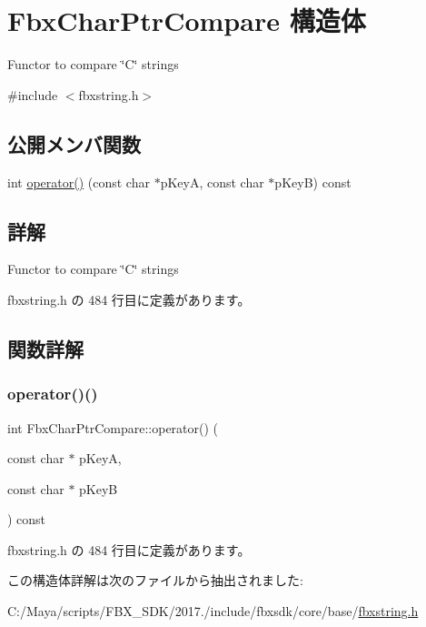 \hypertarget{struct_fbx_char_ptr_compare}{}\section{Fbx\+Char\+Ptr\+Compare 構造体}
\label{struct_fbx_char_ptr_compare}


Functor to compare \char`\"{}\+C\char`\"{} strings  




{\ttfamily \#include $<$fbxstring.\+h$>$}

\subsection*{公開メンバ関数}
\begin{DoxyCompactItemize}
\item 
int \hyperlink{struct_fbx_char_ptr_compare_a5806b2dabf3997394fe7db69526e876d}{operator()} (const char $\ast$p\+KeyA, const char $\ast$p\+KeyB) const
\end{DoxyCompactItemize}


\subsection{詳解}
Functor to compare \char`\"{}\+C\char`\"{} strings 

 fbxstring.\+h の 484 行目に定義があります。



\subsection{関数詳解}
\mbox{\label{struct_fbx_char_ptr_compare_a5806b2dabf3997394fe7db69526e876d}} 
\subsubsection{\texorpdfstring{operator()()}{operator()()}}
{\footnotesize\ttfamily int Fbx\+Char\+Ptr\+Compare\+::operator() (\begin{DoxyParamCaption}\item[{const char $\ast$}]{p\+KeyA,  }\item[{const char $\ast$}]{p\+KeyB }\end{DoxyParamCaption}) const\hspace{0.3cm}{\ttfamily [inline]}}



 fbxstring.\+h の 484 行目に定義があります。



この構造体詳解は次のファイルから抽出されました\+:\begin{DoxyCompactItemize}
\item 
C\+:/\+Maya/scripts/\+F\+B\+X\+\_\+\+S\+D\+K/2017./include/fbxsdk/core/base/\hyperlink{fbxstring_8h}{fbxstring.\+h}\end{DoxyCompactItemize}
